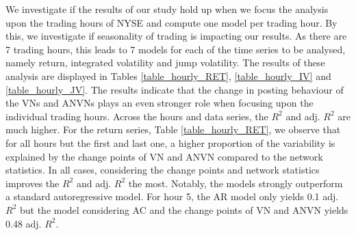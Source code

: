 
We investigate if the results of our study hold up when we focus the analysis upon the trading hours of NYSE and compute one model per trading hour. By this, we investigate if seasonality of trading is impacting our results. As there are 7 trading hours, this leads to 7 models for each of the time series to be analysed, namely return, integrated volatility and jump volatility. %
The results of these analysis are displayed in Tables \ref{table_hourly_RET}, \ref{table_hourly_IV} and \ref{table_hourly_JV}. %
The results indicate that the change in posting behaviour of the VNs and ANVNs plays an even stronger role when focusing upon the individual trading hours. Across the hours and data series, the $R^2$ and adj. $R^2$ are much higher. For the return series, Table \ref{table_hourly_RET}, we observe that for all hours but the first and last one, a higher proportion of the variability is explained by the  change points of VN and ANVN compared to the network statistics. In all cases, considering the change points and network statistics improves the $R^2$ and adj. $R^2$ the most. Notably, the models strongly outperform a standard autoregressive model. For hour 5, the AR model only yields 0.1 adj. $R^2$ but the model considering AC and the change points of VN and ANVN yields 0.48 adj. $R^2$. 


